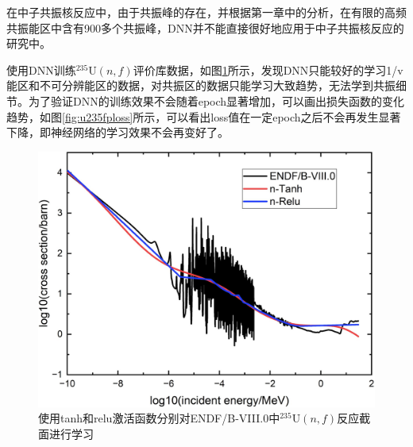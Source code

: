 在中子共振核反应中，由于共振峰的存在，并根据第一章中的分析，在有限的高频共振能区中含有900多个共振峰，DNN并不能直接很好地应用于中子共振核反应的研究中。


使用DNN训练$^{235}\text{U}(n,f)$评价库数据，如图\ref{u235fp}所示，发现DNN只能较好的学习1/v能区和不可分辨能区的数据，对共振区的数据只能学习大致趋势，无法学到共振细节。为了验证DNN的训练效果不会随着epoch显著增加，可以画出损失函数的变化趋势，如图\ref{fig:u235fploss}所示，可以看出loss值在一定epoch之后不会再发生显著下降，即神经网络的学习效果不会再变好了。
\begin{figure}[htbp!]
    \centering
    \includegraphics[width=0.76\linewidth]{figures/fprinciple/u235fp.jpg}
    \caption{使用tanh和relu激活函数分别对ENDF/B-VIII.0中$^{235}\text{U}(n,f)$反应截面进行学习}
    \label{u235fp}
\end{figure}
